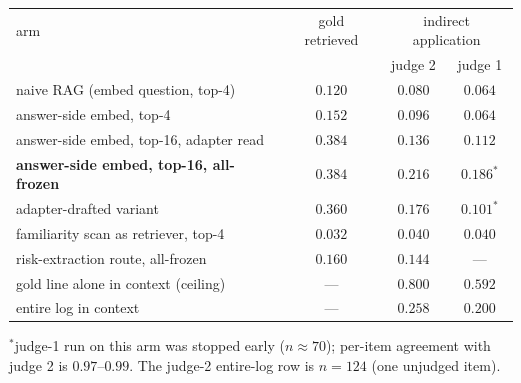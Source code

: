 \documentclass[11pt]{article}
\begin{document}
\begin{center}\small
\setlength{\tabcolsep}{4pt}
\begin{tabular}{lccc}
\toprule
arm & gold retrieved & \multicolumn{2}{c}{indirect application} \\
 & & judge 2 & judge 1 \\
\midrule
naive RAG (embed question, top-4)            & $0.120$ & $0.080$ & $0.064$ \\
answer-side embed, top-4                     & $0.152$ & $0.096$ & $0.064$ \\
answer-side embed, top-16, adapter read      & $0.384$ & $0.136$ & $0.112$ \\
\textbf{answer-side embed, top-16, all-frozen} & $\mathbf{0.384}$ & $\mathbf{0.216}$ & $0.186^{*}$ \\
adapter-drafted variant                      & $0.360$ & $0.176$ & $0.101^{*}$ \\
familiarity scan as retriever, top-4         & $0.032$ & $0.040$ & $0.040$ \\
risk-extraction route, all-frozen            & $0.160$ & $0.144$ & --- \\
gold line alone in context (ceiling)         & ---     & $0.800$ & $0.592$ \\
entire log in context                        & ---     & $0.258$ & $0.200$ \\
\bottomrule
\end{tabular}
\end{center}
{\small $^{*}$judge-1 run on this arm was stopped early ($n{\approx}70$); per-item agreement
with judge 2 is $0.97$--$0.99$. The judge-2 entire-log row is $n{=}124$ (one unjudged item).}
\end{document}
